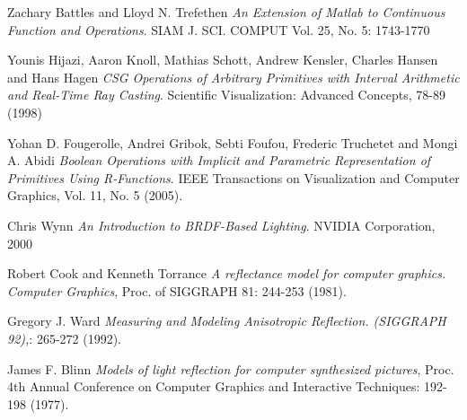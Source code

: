 \documentclass[11pt]{amsart}
\theoremstyle{definition}
\begin{document}
\begin{thebibliography}{9}
  Zachary Battles and Lloyd N. Trefethen
  \emph{An Extension of Matlab to Continuous Function and Operations}.
  SIAM J. SCI. COMPUT Vol. 25, No. 5: 1743-1770 
  
	Younis Hijazi, Aaron Knoll, Mathias Schott, Andrew Kensler, Charles Hansen and Hans Hagen
	\emph{CSG Operations of Arbitrary Primitives with Interval Arithmetic and Real-Time Ray Casting}.
  Scientific Visualization: Advanced Concepts, 78-89 (1998) 
	
	Yohan D. Fougerolle, Andrei Gribok, Sebti Foufou, Frederic Truchetet and Mongi A. Abidi
	\emph{Boolean Operations with Implicit and Parametric Representation of Primitives Using R-Functions}.
  IEEE Transactions on Visualization and Computer Graphics, Vol. 11, No. 5 (2005).
  
	Chris Wynn
	\emph{An Introduction to BRDF-Based Lighting}.
  NVIDIA Corporation, 2000
		
	Robert Cook and Kenneth Torrance
	\emph{A reflectance model for computer graphics. Computer Graphics}, Proc. of SIGGRAPH 81: 244-253 (1981).  
	
Gregory J. Ward 
\emph{Measuring and Modeling Anisotropic Reflection. (SIGGRAPH 92),}: 265-272 (1992).

James F. Blinn  
\emph{Models of light reflection for computer synthesized pictures}, Proc. 4th Annual Conference on Computer Graphics and Interactive Techniques: 192-198 (1977). 



  
\end{thebibliography}




\end{document}
